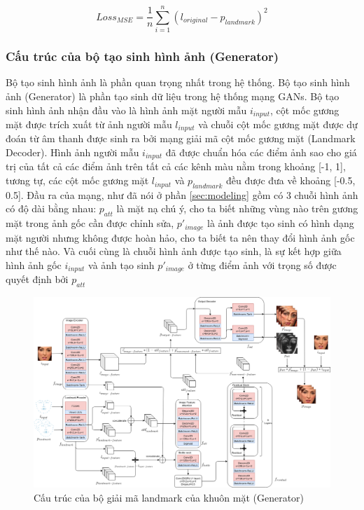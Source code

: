 \begin{equation}
    Loss_{MSE} = \frac{1}{n}\sum^n_{i=1}(l_{original}-p_{landmark})^2
\end{equation}

\subsubsection{Cấu trúc của bộ tạo sinh hình ảnh (Generator)}\label{sec:generator_detail}

Bộ tạo sinh hình ảnh là phần quan trọng nhất trong hệ thống. Bộ tạo sinh hình ảnh (Generator) là phần tạo sinh dữ liệu trong hệ thống mạng GANs. Bộ tạo sinh hình ảnh nhận đầu vào là hình ảnh mặt người mẫu $i_{input}$, cột mốc gương mặt được trích xuất từ ảnh người mẫu $l_{input}$ và chuỗi cột mốc gương mặt được dự đoán từ âm thanh được sinh ra bởi mạng giải mã cột mốc gương mặt (Landmark Decoder). Hình ảnh người mẫu $i_{input}$ đã được chuẩn hóa các điểm ảnh sao cho giá trị của tất cả các điểm ảnh trên tất cả các kênh màu nằm trong khoảng [-1, 1], tương tự, các cột mốc gương mặt $l_{input}$ và $p_{landmark}$ đều được đưa về khoảng [-0.5, 0.5]. Đầu ra của mạng, như đã nói ở phần \ref{sec:modeling} gồm có 3 chuỗi hình ảnh có độ dài bằng nhau: $p_{att}$ là mặt nạ chú ý, cho ta biết những vùng nào trên gương mặt trong ảnh gốc cần được chỉnh sửa, $p'_{image}$ là ảnh được tạo sinh có hình dạng mặt người nhưng không được hoàn hảo, cho ta biết ta nên thay đổi hình ảnh gốc như thế nào. Và cuối cùng là chuỗi hình ảnh được tạo sinh, là sự kết hợp giữa hình ảnh gốc $i_{input}$ và ảnh tạo sinh $p'_{image}$ ở từng điểm ảnh với trọng số được quyết định bởi $p_{att}$ 

\begin{figure}[H]
    \centering
    \includegraphics[width=15cm]{./content/materials/generator.png}
    \caption{Cấu trúc của bộ giải mã landmark của khuôn mặt (Generator)}
\end{figure}

